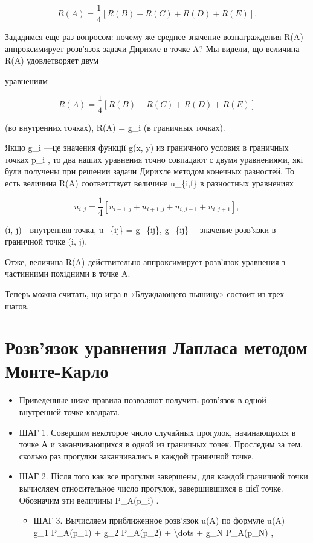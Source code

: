 \documentclass[
]{article}
\providecommand{\tightlist}{%
  \setlength{\itemsep}{0pt}\setlength{\parskip}{0pt}}
\begin{document}
\[
R(A) = \frac{1}{4} [R(B) + R(C) + R(D) + R(E)].
\]

Зададимся еще раз вопросом: почему же среднее значение вознаграждения
R(A) аппроксимирует розв'язок задачи Дирихле в точке A? Мы видели, що
величина R(A) удовлетворяет двум

уравнениям

\[
R(A) = \frac{1}{4} [R(B) + R(C) + R(D) + R(E)]
\]

(во внутренних точках), R(A) = g\_i (в граничных точках).

Якщо g\_i ---це значения функції g(x, y) из граничного условия в
граничных точках p\_i , то два наших уравнения точно совпадают с двумя
уравнениями, які були получены при решении задачи Дирихле методом
конечных разностей. То есть величина R(A) соответствует величине
u\_\{i,f\} в разностных уравнениях

\[
u_{i,j} = \frac{1}{4} \left[ u_{i-1,j} + u_{i+1,j} + u_{i,j-1} + u_{i,j+1} \right],
\]

(i, j)---внутренняя точка, u\_\{ij\} = g\_\{ij\}, g\_\{ij\} ---значение
розв'язки в граничной точке (i, j).

Отже, величина R(A) действительно аппроксимирует розв'язок уравнения з
частинними похідними в точке A.

Теперь можна считать, що игра в «Блуждающего пьяницу» состоит из трех
шагов.

\section{Розв'язок уравнения Лапласа методом
Монте-Карло}\label{ux440ux43eux437ux432ux44fux437ux43eux43a-ux443ux440ux430ux432ux43dux435ux43dux438ux44f-ux43bux430ux43fux43bux430ux441ux430-ux43cux435ux442ux43eux434ux43eux43c-ux43cux43eux43dux442ux435-ux43aux430ux440ux43bux43e}

\begin{itemize}
\item
  Приведенные ниже правила позволяют получить розв'язок в одной
  внутренней точке квадрата.
\item
  ШАГ 1. Совершим некоторое число случайных прогулок, начинающихся в
  точке А и заканчивающихся в одной из граничных точек. Проследим за
  тем, сколько раз прогулки заканчивались в каждой граничной точке.
\item
  ШАГ 2. Після того как все прогулки завершены, для каждой граничной
  точки вычисляем относительное число прогулок, завершившихся в цієї
  точке. Обозначим эти величины P\_A(p\_i) .

  \begin{itemize}
  \tightlist
  \item
    ШАГ 3. Вычисляем приближенное розв'язок u(A) по формуле u(A) = g\_1
    P\_A(p\_1) + g\_2 P\_A(p\_2) + \textbackslash dots + g\_N P\_A(p\_N)
    ,
  \end{itemize}
\end{itemize}
\end{document}
